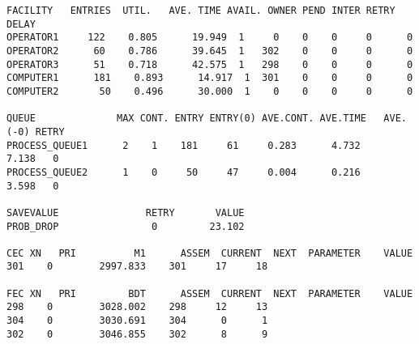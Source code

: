 \begin{lstlisting}[label=data20,caption=Результат работы программы для стандартных данных]
FACILITY   ENTRIES  UTIL.   AVE. TIME AVAIL. OWNER PEND INTER RETRY DELAY
OPERATOR1     122    0.805      19.949  1     0    0    0     0      0
OPERATOR2      60    0.786      39.645  1   302    0    0     0      0
OPERATOR3      51    0.718      42.575  1   298    0    0     0      0
COMPUTER1      181    0.893      14.917  1  301    0    0     0      0
COMPUTER2       50    0.496      30.000  1    0    0    0     0      0

QUEUE              MAX CONT. ENTRY ENTRY(0) AVE.CONT. AVE.TIME   AVE.(-0) RETRY
PROCESS_QUEUE1      2    1    181     61     0.283      4.732      7.138   0
PROCESS_QUEUE2      1    0     50     47     0.004      0.216      3.598   0

SAVEVALUE               RETRY       VALUE
PROB_DROP                0         23.102                            

CEC XN   PRI          M1      ASSEM  CURRENT  NEXT  PARAMETER    VALUE
301    0        2997.833    301     17     18

FEC XN   PRI         BDT      ASSEM  CURRENT  NEXT  PARAMETER    VALUE
298    0        3028.002    298     12     13
304    0        3030.691    304      0      1
302    0        3046.855    302      8      9
\end{lstlisting}


